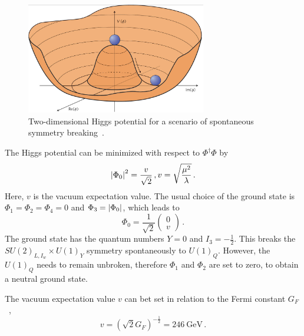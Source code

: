 \begin{figure}[tb]
    \centering
    \includegraphics[width=0.7\textwidth]{./figures/theory/higgs_potential.png}
    \caption{Two-dimensional Higgs potential for a scenario of spontaneous symmetry breaking~\cite{deBoer:2013pud}.}\label{fig:theory:sm:higgspotential}
\end{figure}

The Higgs potential can be minimized with respect to $\Phi^\dagger\Phi$ by
\begin{equation}
    \left|\Phi_0\right|^2 = \frac{v}{\sqrt{2}} \,, v = \sqrt{\frac{\mu^2}{\lambda}} \,.
\end{equation}
Here, $v$ is the vacuum expectation value.
The usual choice of the ground state is $\Phi_1 = \Phi_2 = \Phi_4 = 0$ and $\Phi_3 = \left|\Phi_0\right|$, which leads to
\begin{equation}
    \label{eq:theo:higgs:doublet}
    \Phi_0 = \frac{1}{\sqrt{2}}
    \begin{pmatrix}
        0 \\ v
    \end{pmatrix} \,.
\end{equation}
The ground state has the quantum numbers $Y = 0$ and $I_3 = - \frac{1}{2}$.
This breaks the $SU{(2)}_{L,I_w} \times U{(1)}_Y$ symmetry spontaneously to $U{(1)}_Q$.
However, the $U{(1)}_Q$ needs to remain unbroken, therefore $\Phi_1$ and $\Phi_2$ are set to zero, to obtain a neutral ground state.

The vacuum expectation value $v$ can bet set in relation to the Fermi constant $G_F$~\cite{PDG},
\begin{equation}
    v = {\left(\sqrt{2} G_F \right)}^{-\frac{1}{2}} = \SI{246}{\GeV} \,.
\end{equation}

